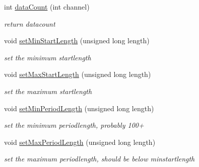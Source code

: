 \begin{DoxyCompactItemize}
int \mbox{\hyperlink{class_r_freceive_af36972eab4c5f65cb96ee4e4742235fb}{data\+Count}} (int channel)
\begin{DoxyCompactList}\small\item\em return datacount \end{DoxyCompactList}\item 
\mbox{\label{class_r_freceive_a761b46a7746f9b570f7377bfc65d4746}} 
void \mbox{\hyperlink{class_r_freceive_a761b46a7746f9b570f7377bfc65d4746}{set\+Min\+Start\+Length}} (unsigned long length)
\begin{DoxyCompactList}\small\item\em set the minimum startlength \end{DoxyCompactList}\item 
\mbox{\label{class_r_freceive_aa56392ddcc63456ae7429b3b6224d2b7}} 
void \mbox{\hyperlink{class_r_freceive_aa56392ddcc63456ae7429b3b6224d2b7}{set\+Max\+Start\+Length}} (unsigned long length)
\begin{DoxyCompactList}\small\item\em set the maximum startlength \end{DoxyCompactList}\item 
\mbox{\label{class_r_freceive_a75ecab73fcfeb13218a1f59c2f51dd0f}} 
void \mbox{\hyperlink{class_r_freceive_a75ecab73fcfeb13218a1f59c2f51dd0f}{set\+Min\+Period\+Length}} (unsigned long length)
\begin{DoxyCompactList}\small\item\em set the minimum periodlength, probably 100+ \end{DoxyCompactList}\item 
\mbox{\label{class_r_freceive_a64119e6557d3e1c53111870d241a5abe}} 
void \mbox{\hyperlink{class_r_freceive_a64119e6557d3e1c53111870d241a5abe}{set\+Max\+Period\+Length}} (unsigned long length)
\begin{DoxyCompactList}\small\item\em set the maximum periodlength, should be below minstartlength \end{DoxyCompactList}\end{DoxyCompactItemize}
